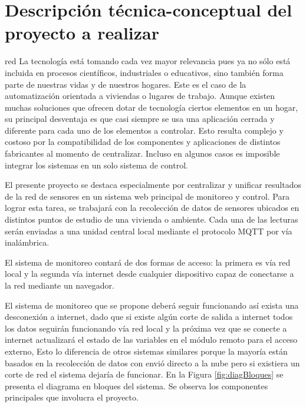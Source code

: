 \documentclass[11pt]{charter}
\begin{document}
\section{Descripción técnica-conceptual del proyecto a realizar}
\label{sec:descripcion}
\begin{consigna}{red}
La tecnología está tomando cada vez mayor relevancia pues ya no sólo está incluida en procesos científicos, industriales o educativos, sino también forma parte de nuestras vidas y de nuestros hogares. Este es el caso de la automatización orientada a viviendas o lugares de trabajo. Aunque existen muchas soluciones que ofrecen dotar de tecnología ciertos elementos en un hogar, su principal desventaja es que casi siempre se usa una aplicación cerrada y diferente para cada uno de los elementos a controlar. Esto resulta complejo y costoso por la compatibilidad de los componentes y aplicaciones de distintos fabricantes al momento de centralizar. Incluso en algunos casos es imposible integrar los sistemas en un solo sistema de control.

El presente proyecto se destaca especialmente por centralizar y unificar resultados de la red de sensores en un sistema web principal de monitoreo y control. Para lograr esta tarea, se trabajará con la recolección de datos de sensores ubicados en distintos puntos de estudio de una vivienda o ambiente. Cada una de las lecturas serán enviadas a una unidad central local mediante el protocolo MQTT por vía inalámbrica.

El sistema de monitoreo contará de dos formas de acceso: la primera es vía red local y la segunda vía internet desde cualquier dispositivo capaz de conectarse a la red mediante un navegador.

El sistema de monitoreo que se propone deberá seguir funcionando así exista una desconexión a internet, dado que si existe algún corte de salida a internet todos los datos seguirán funcionando vía red local y la próxima vez que se conecte a internet actualizará el estado de las variables en el módulo remoto para el acceso externo, Esto lo diferencia de otros sistemas similares porque la mayoría están basados en la recolección de datos con envió directo a la nube pero si existiera un corte de red el sistema dejaría de funcionar. En la Figura \ref{fig:diagBloques} se presenta el diagrama en bloques del sistema. Se observa los componentes principales que involucra el proyecto.

\vspace{20px}


\end{consigna}
\end{document}
